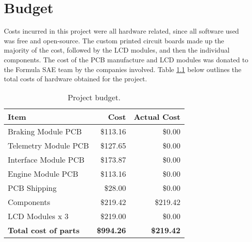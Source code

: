 \chapter{Budget}

Costs incurred in this project were all hardware related, since all software used was free and open-source. The custom printed circuit boards made up the majority of the cost, followed by the LCD modules, and then the individual components. The cost of the PCB manufacture and LCD modules was donated to the Formula SAE team by the companies involved. Table \ref{tab:budget} below outlines the total costs of hardware obtained for the project.

    \begin{table}[H]
      \begin{centering}
	\caption{Project budget.}\label{tab:budget}
	\begin{tabular}{|l|r|r|}
	  \hline 
	  \textbf{Item} & \textbf{Cost} & \textbf{Actual Cost} \tabularnewline
	  \hline
	  \hline 
	  Braking Module PCB & \$113.16 & \$0.00 \tabularnewline
	  \hline 
	  Telemetry Module PCB & \$127.65 & \$0.00\tabularnewline
	  \hline 
	  Interface Module PCB & \$173.87 & \$0.00\tabularnewline
	  \hline 
	  Engine Module PCB & \$113.16 & \$0.00\tabularnewline
	  \hline 
	  PCB Shipping & \$28.00 & \$0.00\tabularnewline
	  \hline
	  Components & \$219.42 & \$219.42 \tabularnewline
	  \hline
	  LCD Modules x 3 & \$219.00 & \$0.00 \tabularnewline
	  \hline
	  \hline 
	  \textbf{Total cost of parts} & \textbf{\$994.26} & \textbf{\$219.42} \tabularnewline
	  \hline
	\end{tabular}
	\par
      \end{centering}
    \end{table}